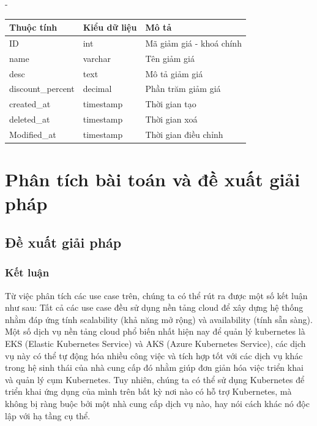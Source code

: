 \begin {list} {-}{}
\begin{itemize}
\begin{table}[h]
\begin{tabular}{|l|l|l|}
        \textbf{Thuộc tính} & \textbf{Kiểu dữ liệu} & \textbf{Mô tả}           \\ \hline
        ID                  & int                   & Mã giảm giá - khoá chính \\ \hline
        name                & varchar               & Tên giảm giá             \\ \hline
        desc                & text                  & Mô tả giảm giá           \\ \hline
        discount\_percent   & decimal               & Phần trăm giảm giá       \\ \hline
        created\_at         & timestamp             & Thời gian tạo            \\ \hline
        deleted\_at         & timestamp             & Thời gian xoá            \\ \hline
        Modified\_at        & timestamp             & Thời gian điều chỉnh     \\ \hline
        \end{tabular}
        \end{table}
\end{itemize}

\section{Phân tích bài toán và đề xuất giải pháp}

\subsection{Đề xuất giải pháp}
\subsubsection{Kết luận}
Từ việc phân tích các use case trên, chúng ta có thể rút ra được một số kết luận như sau:
\noindent Tất cả các use case đều sử dụng nền tảng cloud để xây dựng hệ thống nhằm đáp ứng tính 
scalability (khả năng mở rộng) và availability (tính sẵn sàng). Một số dịch vụ nền tảng cloud phổ biến nhất hiện nay để quản lý kubernetes là EKS (Elastic Kubernetes Service) và AKS (Azure Kubernetes Service), các dịch vụ này có thể tự động hóa nhiều công việc và tích hợp tốt với các dịch vụ khác trong hệ sinh thái của nhà cung cấp đó nhằm giúp đơn giản hóa việc triển khai và quản lý cụm Kubernetes. Tuy nhiên, chúng ta có thể sử dụng Kubernetes để triển khai ứng dụng của mình trên bất kỳ nơi nào có hỗ trợ Kubernetes, mà không bị ràng buộc bởi một nhà cung cấp dịch vụ nào, hay nói cách khác nó độc lập với hạ tầng cụ thể. 


\end{list}
